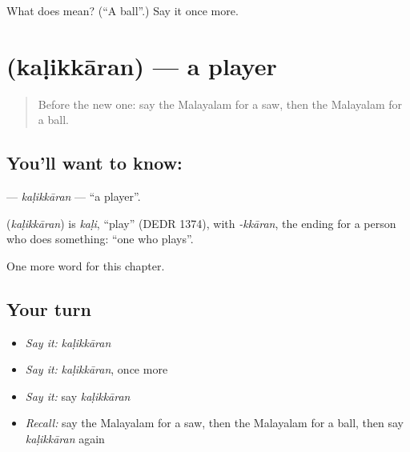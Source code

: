 \begin{tcolorbox}[breakable,colback=teal!4,colframe=teal!35!black,title={Before you move on}]
What does  mean? (\textquotedblleft{}A ball\textquotedblright{}.) Say it once more.
\end{tcolorbox}
\section[\texorpdfstring{\ml{കളിക്കാരൻ} (kaḷikkāran)}{കളിക്കാരൻ (kaḷikkāran)}]{ (kaḷikkāran) — a player}

\label{lesson:ML-C215-kalikkaran}



\begin{quote}
Before the new one: say the Malayalam for a saw, then the Malayalam for a ball.
\end{quote}

\subsection*{You'll want to know: }
\textbf{} — \emph{kaḷikkāran} — \textquotedblleft{}a player\textquotedblright{}.

\begin{cousinweb}
\textbf{} (\emph{kaḷikkāran}) is \emph{kaḷi}, \textquotedblleft{}play\textquotedblright{} (DEDR 1374), with \emph{-kkāran}, the ending for a person who does something: \textquotedblleft{}one who plays\textquotedblright{}.
\end{cousinweb}

\begin{grammarlens}[title={What you've built}]
One more word for this chapter.
\end{grammarlens}

\subsection*{Your turn}
\begin{itemize}
\raggedright
  \item \emph{Say it:} \emph{kaḷikkāran}
  \item \emph{Say it:} \emph{kaḷikkāran}, once more
  \item \emph{Say it:} say \emph{kaḷikkāran}
  \item \emph{Recall:} say the Malayalam for a saw, then the Malayalam for a ball, then say \emph{kaḷikkāran} again
\end{itemize}


